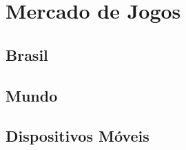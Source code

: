 
\chapter{Mercado de Jogos}
\label{cap:mercadoJogos}


\section{Brasil}


\section{Mundo}



\section{Dispositivos Móveis}
